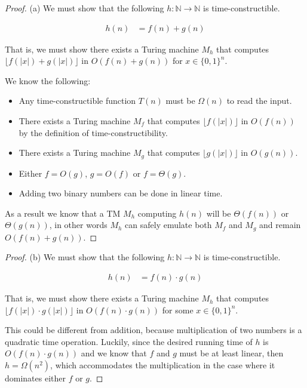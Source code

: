 \documentclass[usletter]{article}
\begin{document}
\begin{enumerate}
    \begin{proof} (a)
      We must show that the following $h : \mathbb{N} \rightarrow \mathbb{N}$ is time-constructible.

      \begin{align*}
        h(n) &= f(n) + g(n)
      \end{align*}

      That is, we must show there exists a Turing machine $M_h$ that computes $\lfloor f(|x|) + g(|x|) \rfloor$ in $O(f(n) + g(n))$ for $x \in \{0,1\}^n$.

      We know the following:

      \begin{itemize}
        \item Any time-constructible function $T(n)$ must be $\Omega(n)$ to read the input.

        \item There exists a Turing machine $M_f$ that computes $\lfloor f(|x|) \rfloor$ in $O(f(n))$ by the definition of time-constructibility.

        \item There exists a Turing machine $M_g$ that computes $\lfloor g(|x|) \rfloor$ in $O(g(n))$.

        \item Either $f = O(g)$, $g = O(f)$ or $f = \Theta(g)$.

        \item Adding two binary numbers can be done in linear time.
      \end{itemize}

      As a result we know that a TM $M_h$ computing $h(n)$ will be $\Theta(f(n))$ or $\Theta(g(n))$, in other words $M_h$ can safely emulate both $M_f$ and $M_g$ and remain $O(f(n) + g(n))$.
    \end{proof}

    \begin{proof} (b)
      We must show that the following $h : \mathbb{N} \rightarrow \mathbb{N}$ is time-constructible.

      \begin{align*}
        h(n) &= f(n) \cdot g(n)
      \end{align*}

      That is, we must show there exists a Turing machine $M_h$ that computes $\lfloor f(|x|) \cdot g(|x|) \rfloor$ in $O(f(n) \cdot g(n))$ for some $x \in \{0,1\}^n$.

      This could be different from addition, because multiplication of two numbers is a quadratic time operation. Luckily, since the desired running time of $h$ is $O(f(n) \cdot g(n))$ and we know that $f$ and $g$ must be at least linear, then $h = \Omega(n^2)$, which accommodates the multiplication in the case where it dominates either $f$ or $g$.


\end{proof}
\end{enumerate}
\end{document}

